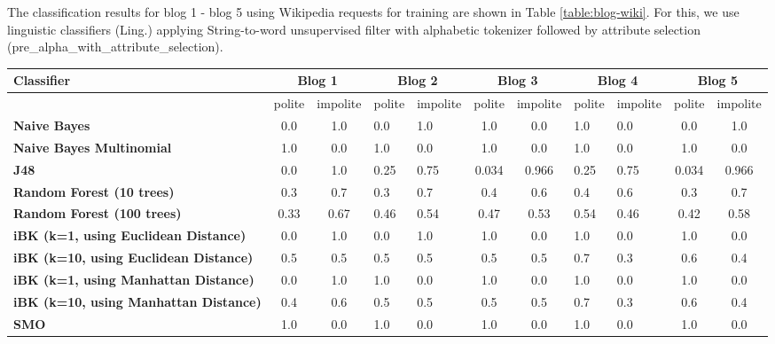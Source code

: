 \documentclass[conference]{IEEEtran}
\begin{document}
The classification results for blog 1 - blog 5 using Wikipedia requests for training are shown in Table \ref{table:blog-wiki}. For this, we use linguistic classifiers (Ling.) applying String-to-word unsupervised filter with alphabetic tokenizer followed by attribute selection (pre\_alpha\_with\_attribute\_selection). 

\begin{table*}[htbp]
\caption{Classification results using Wikipedia requests for training for blog 1 - blog 5}
\centering
\vspace{5pt}
\begin{tabular}{|l|c|c|l|l|c|c|l|l|c|c|}
\hline
\textbf{Classifier} & \multicolumn{2}{|c|}{\textbf{Blog 1}} & \multicolumn{2}{|c|}{\textbf{Blog 2}} & \multicolumn{2}{|c|}{\textbf{Blog 3}} & \multicolumn{2}{|c|}{\textbf{Blog 4}} & \multicolumn{2}{|c|}{\textbf{Blog 5}} \\
\hline
& polite & impolite & polite & impolite & polite & impolite & polite & impolite & polite & impolite \\
\hline\hline
\textbf{Naive Bayes} & 0.0 & 1.0 & 0.0 & 1.0 & 1.0 & 0.0 & 1.0 & 0.0 & 0.0 & 1.0 \\ 
\hline
\textbf{Naive Bayes Multinomial} & 1.0 & 0.0 & 1.0 & 0.0 & 1.0 & 0.0 & 1.0 & 0.0 & 1.0 & 0.0 \\ 
\hline
\textbf{J48} & 0.0 & 1.0 & 0.25 & 0.75 & 0.034 & 0.966 & 0.25 & 0.75 & 0.034 & 0.966 \\ 
\hline
\textbf{Random Forest (10 trees)} & 0.3 & 0.7 & 0.3 & 0.7 & 0.4 & 0.6 & 0.4 & 0.6 & 0.3 & 0.7 \\ 
\hline
\textbf{Random Forest (100 trees)} & 0.33 & 0.67 & 0.46 & 0.54 & 0.47 & 0.53 & 0.54 & 0.46 & 0.42 & 0.58 \\ 
\hline
\textbf{iBK (k=1, using Euclidean Distance)} & 0.0 & 1.0 & 0.0 & 1.0 & 1.0 & 0.0 & 1.0 & 0.0 & 1.0 & 0.0 \\ 
\hline
\textbf{iBK (k=10, using Euclidean Distance)} & 0.5 & 0.5 & 0.5 & 0.5 & 0.5 & 0.5 & 0.7 & 0.3 & 0.6 & 0.4 \\ 
\hline
\textbf{iBK (k=1, using Manhattan Distance)} & 0.0 & 1.0 & 1.0 & 0.0 & 1.0 & 0.0 & 1.0 & 0.0 & 1.0 & 0.0 \\ 
\hline
\textbf{iBK (k=10, using Manhattan Distance)} & 0.4 & 0.6 & 0.5 & 0.5 & 0.5 & 0.5 & 0.7 & 0.3 & 0.6 & 0.4 \\ 
\hline
\textbf{SMO} & 1.0 & 0.0 & 1.0 & 0.0 & 1.0 & 0.0 & 1.0 & 0.0 & 1.0 & 0.0 \\ 
\hline
\hline
\end{tabular}
\label{table:blog-wiki}
\end{table*}
\end{document}
